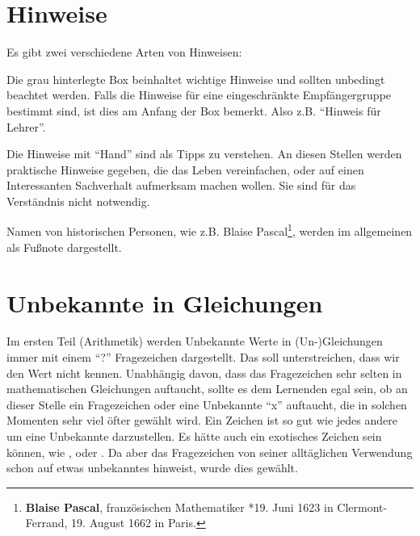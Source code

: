 \section{Hinweise}

Es gibt zwei verschiedene Arten von Hinweisen: 

\begin{svgraybox}
Die grau hinterlegte Box beinhaltet wichtige Hinweise und sollten unbedingt beachtet werden. Falls die Hinweise für eine eingeschränkte Empfängergruppe bestimmt sind, ist dies am Anfang der Box bemerkt. Also z.B. "`Hinweis für Lehrer"'. 
\end{svgraybox}

\bigskip

\HandRight \qquad Die Hinweise mit "`Hand"' sind als Tipps zu verstehen. An diesen Stellen werden praktische Hinweise gegeben, die das Leben vereinfachen, oder auf einen Interessanten Sachverhalt aufmerksam machen wollen. Sie sind für das Verständnis nicht notwendig. 

\bigskip

Namen von historischen Personen, wie z.B. Blaise Pascal\footnote{\textbf{Blaise Pascal}, französischen Mathematiker *19. Juni 1623 in Clermont-Ferrand, 19. August 1662 in Paris.}, werden im allgemeinen als Fußnote dargestellt. 


\section{Unbekannte in Gleichungen}

Im ersten Teil (Arithmetik) werden Unbekannte Werte in (Un-)Gleichungen immer mit einem "`?"' Fragezeichen dargestellt. Das soll unterstreichen, dass wir den Wert nicht kennen. Unabhängig davon, dass das Fragezeichen sehr selten in mathematischen Gleichungen auftaucht, sollte es dem Lernenden egal sein, ob an dieser Stelle ein Fragezeichen oder eine Unbekannte "`x"' auftaucht, die in solchen Momenten sehr viel öfter gewählt wird. Ein Zeichen ist so gut wie jedes andere um eine Unbekannte darzustellen. Es hätte auch ein exotisches Zeichen sein können, wie , oder . Da aber das Fragezeichen von seiner alltäglichen Verwendung schon auf etwas unbekanntes hinweist, wurde dies gewählt. 



